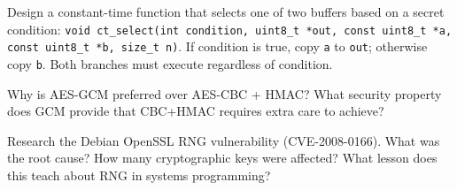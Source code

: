 \begin{exercise}
	Design a constant-time function that selects one of two buffers based on a secret condition: \texttt{void ct\_select(int condition, uint8\_t *out, const uint8\_t *a, const uint8\_t *b, size\_t n)}. If condition is true, copy \texttt{a} to \texttt{out}; otherwise copy \texttt{b}. Both branches must execute regardless of condition.
\end{exercise}

\begin{exercise}
	Why is AES-GCM preferred over AES-CBC + HMAC? What security property does GCM provide that CBC+HMAC requires extra care to achieve?
\end{exercise}

\begin{exercise}
	Research the Debian OpenSSL RNG vulnerability (CVE-2008-0166). What was the root cause? How many cryptographic keys were affected? What lesson does this teach about RNG in systems programming?
\end{exercise}
